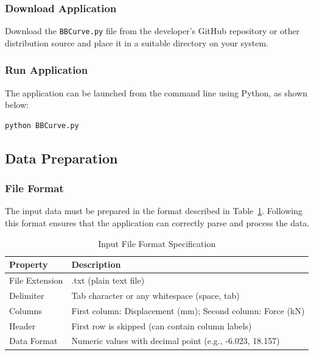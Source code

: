 \documentclass[11pt,a4paper]{article}
\begin{document}
\subsubsection{Download Application}

Download the \texttt{BBCurve.py} file from the developer's GitHub repository or other distribution source and place it in a suitable directory on your system.

\subsubsection{Run Application}

The application can be launched from the command line using Python, as shown below:

\begin{lstlisting}
python BBCurve.py
\end{lstlisting}

\subsection{Data Preparation}

\subsubsection{File Format}

The input data must be prepared in the format described in Table~\ref{tab:file_format}. Following this format ensures that the application can correctly parse and process the data.

\begin{table}[h]
\centering
\caption{Input File Format Specification}\label{tab:file_format}
\begin{tabular}{p{4cm}p{10cm}}
\toprule
\textbf{Property} & \textbf{Description} \\
\midrule
File Extension & .txt (plain text file) \\
Delimiter & Tab character or any whitespace (space, tab) \\
Columns & First column: Displacement (mm); Second column: Force (kN) \\
Header & First row is skipped (can contain column labels) \\
Data Format & Numeric values with decimal point (e.g., -6.023, 18.157) \\
\bottomrule
\end{tabular}
\end{table}
\end{document}
